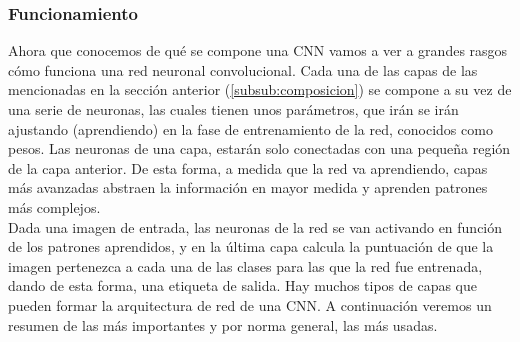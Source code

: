 \documentclass[a4paper,11pt]{book}
\begin{document}
\subsubsection{Funcionamiento}\label{sub:funcionamientoCnn}
Ahora que conocemos de qué se compone una CNN vamos a ver a grandes rasgos cómo funciona una red neuronal convolucional. Cada una de las capas de las mencionadas en la sección anterior (\ref{subsub:composicion}) se compone a su vez de una serie de neuronas, las cuales tienen unos parámetros, que irán se irán ajustando (aprendiendo) en la fase de entrenamiento de la red, conocidos como pesos. Las neuronas de una capa, estarán solo conectadas con una pequeña región de la capa anterior. De esta forma, a medida que la red va aprendiendo, capas más avanzadas abstraen la información en mayor medida y aprenden patrones más complejos.\\
Dada una imagen de entrada, las neuronas de la red se van activando en función de los patrones aprendidos, y en la última capa calcula la puntuación de que la imagen pertenezca a cada una de las clases para las que la red fue entrenada, dando de esta forma, una etiqueta de salida. Hay muchos tipos de capas que pueden formar la arquitectura de red de una CNN. A continuación veremos un resumen de las más importantes y por norma general, las más usadas.
\end{document}
